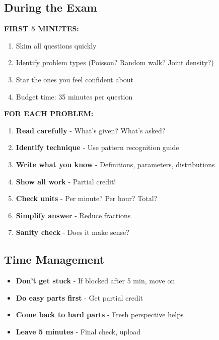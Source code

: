 \documentclass[10pt,letterpaper]{article}
\begin{document}
\subsection{During the Exam}

\begin{strategybox}
\textbf{FIRST 5 MINUTES:}
\begin{enumerate}
  \item Skim all questions quickly
  \item Identify problem types (Poisson? Random walk? Joint density?)
  \item Star the ones you feel confident about
  \item Budget time: 35 minutes per question
\end{enumerate}
\end{strategybox}

\begin{strategybox}
\textbf{FOR EACH PROBLEM:}
\begin{enumerate}
  \item \textbf{Read carefully} - What's given? What's asked?
  \item \textbf{Identify technique} - Use pattern recognition guide
  \item \textbf{Write what you know} - Definitions, parameters, distributions
  \item \textbf{Show all work} - Partial credit!
  \item \textbf{Check units} - Per minute? Per hour? Total?
  \item \textbf{Simplify answer} - Reduce fractions
  \item \textbf{Sanity check} - Does it make sense?
\end{enumerate}
\end{strategybox}

\subsection{Time Management}

\begin{itemize}[leftmargin=*]
  \item \textbf{Don't get stuck} - If blocked after 5 min, move on
  \item \textbf{Do easy parts first} - Get partial credit
  \item \textbf{Come back to hard parts} - Fresh perspective helps
  \item \textbf{Leave 5 minutes} - Final check, upload
\end{itemize}
\end{document}

